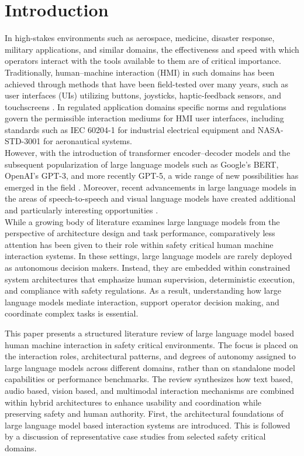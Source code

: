 \section{Introduction}
\label{sec:intro}

In high-stakes environments such as aerospace, medicine, disaster response, military applications, and similar domains, the effectiveness and speed with which operators interact with the tools available to them are of critical importance.
Traditionally, human–machine interaction (HMI) in such domains has been achieved through methods that have been field-tested over many years, such as user interfaces (UIs) utilizing buttons, joysticks, haptic-feedback sensors, and touchscreens \cite{rathan2025hmi}.
In regulated application domains specific norms and regulations govern the permissible interaction mediums for HMI user interfaces, including standards such as IEC 60204-1 for industrial electrical equipment and NASA-STD-3001 for aeronautical systems.\cite{iec6020412016}\cite{childress2023} 
\\

However, with the introduction of transformer encoder–decoder models and the subsequent popularization of large language models such as Google’s BERT, OpenAI’s GPT-3, and more recently GPT-5, a wide range of new possibilities has emerged in the field \cite{cui2025speechlm}. 
Moreover, recent advancements in large language models in the areas of speech-to-speech and visual language models have created additional and particularly interesting opportunities \cite{carolan2024multimodal}.
\\

While a growing body of literature examines large language models from the perspective of architecture design and task performance, comparatively less attention has been given to their role within safety critical human machine interaction systems. 
In these settings, large language models are rarely deployed as autonomous decision makers. Instead, they are embedded within constrained system architectures that emphasize human supervision, deterministic execution, and compliance with safety regulations. 
As a result, understanding how large language models mediate interaction, support operator decision making, and coordinate complex tasks is essential.

This paper presents a structured literature review of large language model based human machine interaction in safety critical environments. 
The focus is placed on the interaction roles, architectural patterns, and degrees of autonomy assigned to large language models across different domains, rather than on standalone model capabilities or performance benchmarks. 
The review synthesizes how text based, audio based, vision based, and multimodal interaction mechanisms are combined within hybrid architectures to enhance usability and coordination while preserving safety and human authority. 
First, the architectural foundations of large language model based interaction systems are introduced. 
This is followed by a discussion of representative case studies from selected safety critical domains.
